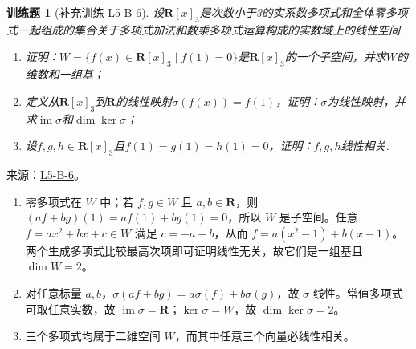 \documentclass[UTF8,12pt,a4paper,fontset=fandol]{ctexart}
\newtheorem{exercise}{训练题}[section]
\begin{document}
\begin{exercise}[补充训练 L5-B-6]\label{prob:L5-B-6}
设$\mathbf{R}[x]_3$是次数小于3的实系数多项式和全体零多项式一起组成的集合关于多项式加法和数乘多项式运算构成的实数域上的线性空间.
        \begin{enumerate}
            \item 证明：$W=\{f(x)\in \mathbf{R}[x]_3 \mid f(1)=0\}$是$\mathbf{R}[x]_3$的一个子空间，并求$W$的维数和一组基；

            \item 定义从$\mathbf{R}[x]_3$到$\mathbf{R}$的线性映射$\sigma(f(x))=f(1)$，证明：$\sigma$为线性映射，并求$\operatorname{im}\sigma$和$\dim\ker\sigma$；

            \item 设$f,g,h \in \mathbf{R}[x]_3$且$f(1)=g(1)=h(1)=0$，证明：$f,g,h$线性相关.
        \end{enumerate}
\end{exercise}
\noindent 来源：\href{https://github.com/yhwu-is/Linear-Algebra-Left-Undone/blob/new/%E8%AE%B2%E4%B9%89/%E4%B8%93%E9%A2%98/5%20%E7%BA%BF%E6%80%A7%E6%98%A0%E5%B0%84.tex}{L5-B-6}。
\begin{solve}
\begin{enumerate}
\item 零多项式在 $W$ 中；若 $f,g\in W$ 且 $a,b\in\mathbf R$，则 $(af+bg)(1)=af(1)+bg(1)=0$，所以 $W$ 是子空间。任意 $f=ax^2+bx+c\in W$ 满足 $c=-a-b$，从而 $f=a(x^2-1)+b(x-1)$。两个生成多项式比较最高次项即可证明线性无关，故它们是一组基且 $\dim W=2$。
\item 对任意标量 $a,b$，$\sigma(af+bg)=a\sigma(f)+b\sigma(g)$，故 $\sigma$ 线性。常值多项式可取任意实数，故 $\operatorname{im}\sigma=\mathbf R$；$\ker\sigma=W$，故 $\dim\ker\sigma=2$。
\item 三个多项式均属于二维空间 $W$，而其中任意三个向量必线性相关。\end{enumerate}
\end{solve}
\end{document}
